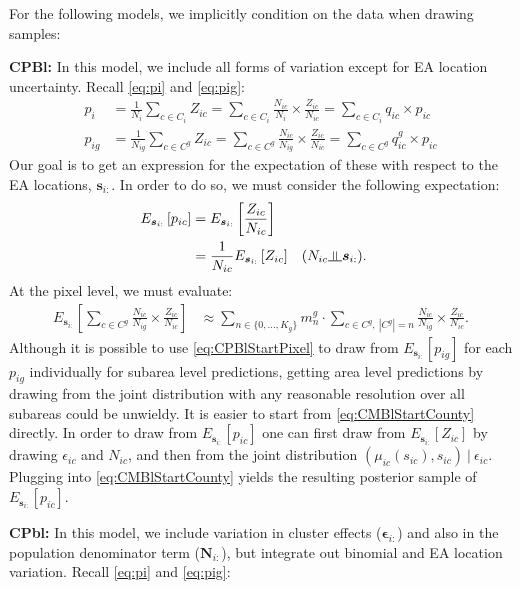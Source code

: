 \documentclass[12pt]{article}
\newcommand{\indep}{\rotatebox[origin=c]{90}{$\models$}}
\begin{document}
For the following models, we implicitly condition on the data when drawing samples:

\medskip
\noindent
\textbf{CPBl:} In this model, we include all forms of variation except for EA location uncertainty.  Recall \eqref{eq:pi} and \eqref{eq:pig}: 
\begin{align*}
p_i &= \frac{1}{N_i}\sum_{c \in C_i} Z_{ic} = \sum_{c \in C_i} \frac{N_{ic}}{N_i}  \times \frac{Z_{ic}}{N_{ic}}  =  \sum_{c \in C_i} q_{ic} \times p_{ic} \\
p_{ig} &= \frac{1}{N_{ig}} \sum_{c \in C^g} Z_{ic} = \sum_{c \in C^g} \frac{N_{ic}}{N_{ig}}  \times \frac{Z_{ic}}{N_{ic}}  =  \sum_{c \in C^g} q_{ic}^g \times p_{ic}
\end{align*}
Our goal is to get an expression for the expectation of these with respect to the EA locations, $\boldsymbol{s}_{i:}$. In order to do so, we must consider the following expectation: 
\begin{align}
E_{\boldsymbol{s}_{i:}}  \left [ p_{ic} \right ] &= E_{\boldsymbol{s}_{i:}}  \left [ \frac{Z_{ic}}{N_{ic}}  \right ]  \\
&= \frac{1}{N_{ic}} E_{\boldsymbol{s}_{i:}}  \left [ Z_{ic}  \right ]  && (N_{ic} \indep \boldsymbol{s}_{i:}). \label{eq:CMBlStartCounty} 
\end{align}
At the pixel level, we must evaluate: 
\begin{align}
 E_{\boldsymbol{s}_{i:}}  \left [ \sum_{c \in C^g} \frac{N_{ic}}{N_{ig}}  \times \frac{Z_{ic}}{N_{ic}} \right ] & \approx  \sum_{n \in \{0,...,K_g\}} m_n^g  \cdot \sum_{c \in C^g, \ |C^g|=n} \frac{N_{ic}}{N_{ig}} \times  \frac{Z_{ic}}{N_{ic}}. \label{eq:CPBlStartPixel}
\end{align}
Although it is possible to use \eqref{eq:CPBlStartPixel} to draw from $ E_{\boldsymbol{s}_{i:}}  \left [ p_{ig} \right ]$ for each $p_{ig}$ individually for subarea level predictions, getting area level predictions by drawing from the joint distribution with any reasonable resolution over all subareas could be unwieldy. It is easier to start from \eqref{eq:CMBlStartCounty} directly.  In order to draw from $E_{\boldsymbol{s}_{i:}}  \left [ p_{ic} \right ]$ one can first draw from $E_{\boldsymbol{s}_{i:}}[Z_{ic}]$ by drawing $\epsilon_{ic}$ and $N_{ic}$, and then from the joint distribution $(\mu_{ic}(s_{ic}), s_{ic}) \ \vert \ \epsilon_{ic}$.  Plugging into \eqref{eq:CMBlStartCounty} yields the resulting posterior sample of $E_{\boldsymbol{s}_{i:}}  \left [ p_{ic} \right ]$.

\medskip
\noindent
\textbf{CPbl:} In this model, we include variation in cluster effects ($\boldsymbol{ \epsilon }_{i:}$) and also in the population denominator term ($\boldsymbol{N}_{i:}$), but integrate out binomial and EA location variation. Recall \eqref{eq:pi} and \eqref{eq:pig}: 
\end{document}

